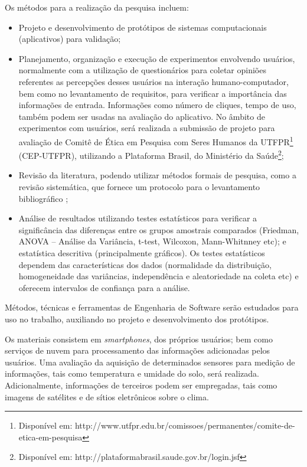\documentclass[12pt]{article}
\begin{document}
Os métodos para a realização da pesquisa incluem:

\begin{itemize}
	\item Projeto e desenvolvimento de protótipos de sistemas computacionais (aplicativos) para validação;
	\item Planejamento, organização e execução de experimentos envolvendo usuários, normalmente com a utilização de questionários para coletar opiniões referentes as percepções desses usuários na interação humano-computador, bem como no levantamento de requisitos, para verificar a importância das informações de entrada. Informações como número de cliques, tempo de uso, também podem ser usadas na avaliação do aplicativo. No âmbito de experimentos com usuários, será realizada a submissão de projeto para avaliação de Comitê de Ética em Pesquisa com Seres Humanos da UTFPR\footnote{Disponível em: http://www.utfpr.edu.br/comissoes/permanentes/comite-de-etica-em-pesquisa} (CEP-UTFPR), utilizando a Plataforma Brasil, do Ministério da Saúde\footnote{Disponível em: http://plataformabrasil.saude.gov.br/login.jsf};
	\item Revisão da literatura, podendo utilizar métodos formais de pesquisa, como a revisão sistemática, que fornece um protocolo para o levantamento bibliográfico \cite{Kitchenham:2004};
	\item Análise de resultados utilizando testes estatísticos para verificar a significância das diferenças entre os grupos amostrais comparados (Friedman, ANOVA – Análise da Variância, t-test, Wilcoxon, Mann-Whitnney etc); e estatística descritiva (principalmente gráficos). Os testes estatísticos dependem das características dos dados (normalidade da distribuição, homogeneidade das variâncias, independência e aleatoriedade na coleta etc) e oferecem intervalos de confiança para a análise.
\end{itemize}

Métodos, técnicas e ferramentas de Engenharia de Software serão estudados para uso no trabalho, auxiliando no projeto e desenvolvimento dos protótipos.

Os materiais consistem em \textit{smartphones}, dos próprios usuários; bem como serviços de nuvem para processamento das informações adicionadas pelos usuários. Uma avaliação da aquisição de determinados sensores para medição de informações, tais como temperatura e umidade do solo, será realizada. Adicionalmente, informações de terceiros podem ser empregadas, tais como imagens de satélites e de sítios eletrônicos sobre o clima. 		
\end{document}
